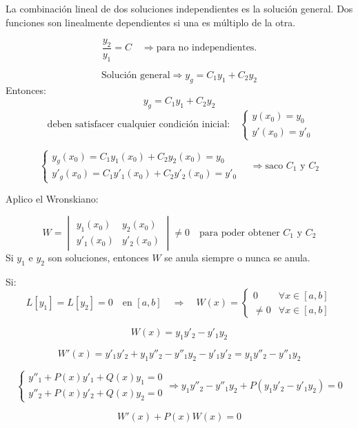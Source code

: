 \documentclass[a4paper,12pt]{article}
\begin{document}
\newpage
\noindent
La combinación lineal de dos soluciones independientes es la solución general.  
Dos funciones son linealmente dependientes si una es múltiplo de la otra.

\[
\frac{y_2}{y_1 } = C  \quad \Longrightarrow \text{para no independientes.}
\]

\[
\text{Solución general} \Rightarrow y_g = C_1 y_1 + C_2 y_2
\]
Entonces: 
\[
y_g = C_1 y_1 + C_2 y_2 
\]
\[
\text{ deben satisfacer cualquier condición inicial:} 
\quad 
\begin{cases}
y(x_0) = y_0 \\
y'(x_0) = y'_0
\end{cases}
\]


\[
\begin{cases}
y_g(x_0) = C_1 y_1(x_0) + C_2 y_2(x_0) = y_0 \\
y'_g(x_0) = C_1 y'_1(x_0) + C_2 y'_2(x_0) = y'_0
\end{cases}
\quad \Rightarrow \text{saco } C_1 \text{ y } C_2
\]

\bigskip
\noindent
Aplico el Wronskiano:

\[
W = 
\begin{vmatrix}
y_1(x_0) & y_2(x_0) \\
y'_1(x_0) & y'_2(x_0)
\end{vmatrix}
\neq 0
\quad \text{para poder obtener } C_1 \text{ y } C_2
\]
Si \( y_1 \) e \( y_2 \) son soluciones, entonces \( W \) se anula siempre o nunca se anula.

\medskip
\noindent
Si:
\[
L[y_1] = L[y_2] = 0 \quad \text{en } [a,b] 
\quad \Rightarrow \quad 
W(x) = 
\begin{cases}
0 & \forall x \in [a,b] \\
\neq 0 & \forall x \in [a,b]
\end{cases}
\]

\[
W(x) = y_1 y'_2 - y'_1 y_2
\]

\[
W'(x) = y'_1 y'_2 + y_1 y''_2 - y''_1 y_2 - y'_1 y'_2 = y_1 y''_2 - y''_1 y_2
\]

\[
\begin{cases}
y''_1 + P(x)y'_1 + Q(x)y_1 = 0 \\
y''_2 + P(x)y'_2 + Q(x)y_2 = 0
\end{cases}
\Rightarrow 
y_1 y''_2 - y''_1 y_2 + P(y_1 y'_2 - y'_1 y_2) = 0
\]

\[
W'(x) + P(x)W(x) = 0
\]
\end{document}
